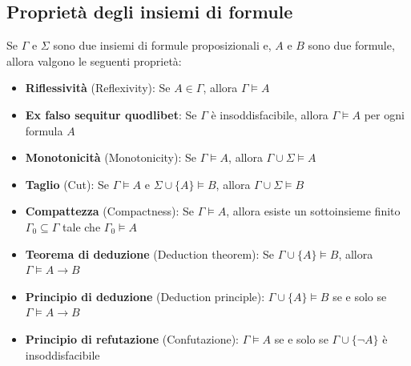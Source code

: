 \subsection{Proprietà degli insiemi di formule}
Se $\Gamma$ e $\Sigma$ sono due insiemi di formule proposizionali e, $A$ e $B$ sono due formule, allora valgono le seguenti proprietà:
\begin{itemize}
    \item \textbf{Riflessività} (Reflexivity): Se \(A\in\Gamma\), allora \(\Gamma\models A\)
    \item \textbf{Ex falso sequitur quodlibet}: Se \(\Gamma\) è insoddisfacibile, allora \(\Gamma\models A\) per ogni formula \(A\)
    \item \textbf{Monotonicità} (Monotonicity): Se \(\Gamma\models A\), allora \(\Gamma\cup\Sigma\models A\)
    \item \textbf{Taglio} (Cut): Se \(\Gamma\models A\) e \(\Sigma\cup\{A\}\models B\), allora \(\Gamma\cup\Sigma\models B\)
    \item \textbf{Compattezza} (Compactness): Se \(\Gamma\models A\), allora esiste un sottoinsieme finito \(\Gamma_0\subseteq\Gamma\) tale che \(\Gamma_0\models A\)
    \item \textbf{Teorema di deduzione} (Deduction theorem): Se \(\Gamma\cup\{A\}\models B\), allora \(\Gamma\models A\rightarrow B\)
    \item \textbf{Principio di deduzione} (Deduction principle): \(\Gamma\cup\{A\}\models B\) se e solo se \(\Gamma\models A\rightarrow B\)
    \item \textbf{Principio di refutazione} (Confutazione): \(\Gamma\models A\) se e solo se \(\Gamma\cup\{\neg A\}\) è insoddisfacibile
\end{itemize}


